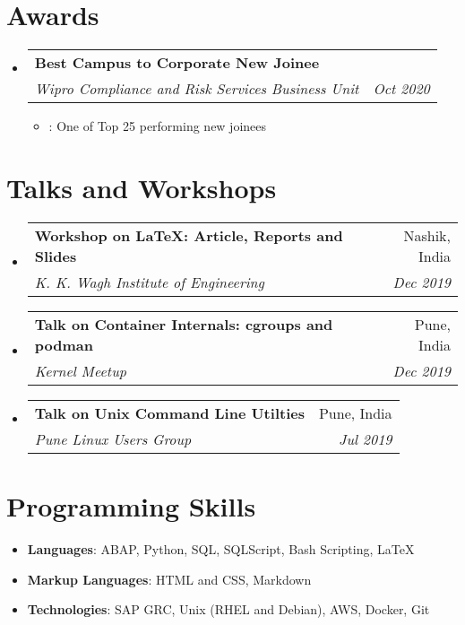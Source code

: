 \documentclass[letterpaper,11pt]{article}
\makeatletter
\newcommand{\resumeItem}[2]{
  \item\small{
    \textbf{#1}{: #2 \vspace{-2pt}}
  }
}
\newcommand{\resumeSubheading}[4]{
  \vspace{-1pt}\item
    \begin{tabular*}{0.97\textwidth}[t]{l@{\extracolsep{\fill}}r}
      \textbf{#1} & #2 \\
      \textit{\small#3} & \textit{\small #4} \\
    \end{tabular*}\vspace{-5pt}
}
\newcommand{\resumeSubSubheading}[2]{
    \begin{tabular*}{0.97\textwidth}{l@{\extracolsep{\fill}}r}
      \textit{\small#1} & \textit{\small #2} \\
    \end{tabular*}\vspace{-5pt}
}
\newcommand{\resumeSubHeadingListStart}{\begin{itemize}[leftmargin=*]}
\newcommand{\resumeSubHeadingListEnd}{\end{itemize}}
\newcommand{\resumeItemListStart}{\begin{itemize}}
\newcommand{\resumeItemListEnd}{\end{itemize}\vspace{-5pt}}
\makeatother
\begin{document}


\section{Awards}
  \resumeSubHeadingListStart
	  	\resumeSubheading
	  	  {Best Campus to Corporate New Joinee}{}
		  {Wipro Compliance and Risk Services Business Unit}{Oct 2020}
		  \resumeItemListStart
			  \resumeItem{}{One of Top 25 performing new joinees}
		  \resumeItemListEnd
  \resumeSubHeadingListEnd

\section{Talks and Workshops}
	\resumeSubHeadingListStart
	  	\resumeSubheading
	  	  {Workshop on LaTeX: Article, Reports and Slides}{Nashik, India}
		  {K. K. Wagh Institute of Engineering}{Dec 2019}
	  	\resumeSubheading
	  	  {Talk on Container Internals: cgroups and podman}{Pune, India}
		  {Kernel Meetup}{Dec 2019}
	  	\resumeSubheading
	  	  {Talk on Unix Command Line Utilties}{Pune, India}
		  {Pune Linux Users Group}{Jul 2019}
	\resumeSubHeadingListEnd

\section{Programming Skills}
	\resumeSubHeadingListStart
		\item{\textbf{Languages}{: ABAP, Python, SQL, SQLScript, Bash Scripting, LaTeX} }
			\hfill
		\item{\textbf{Markup Languages}{: HTML and CSS, Markdown} }
			\hfill
		\item{\textbf{Technologies}{: SAP GRC, Unix (RHEL and Debian), AWS, Docker, Git} }
			\hfill
	\resumeSubHeadingListEnd

\end{document}
